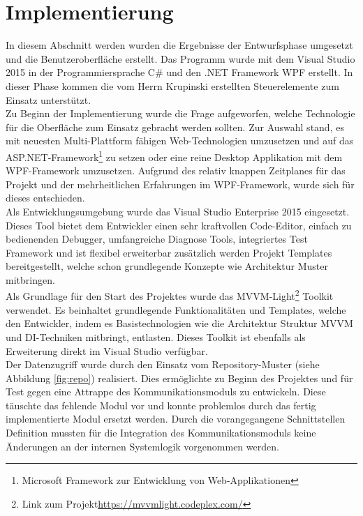 \section{Implementierung}
In diesem Abschnitt werden wurden die Ergebnisse der Entwurfsphase umgesetzt und die Benutzeroberfläche erstellt. Das Programm wurde mit dem Visual Studio 2015 in der Programmiersprache C\# und den .NET Framework WPF erstellt. In dieser Phase kommen die vom Herrn Krupinski erstellten Steuerelemente zum Einsatz unterstützt.\\

Zu Beginn der Implementierung wurde die Frage aufgeworfen, welche Technologie für die Oberfläche zum Einsatz gebracht werden sollten. Zur Auswahl stand, es mit neuesten Multi-Plattform fähigen Web-Technologien umzusetzen und auf das ASP.NET-Framework\footnote{Microsoft Framework zur Entwicklung von Web-Applikationen} zu setzen oder eine reine Desktop Applikation mit dem WPF-Framework umzusetzen. Aufgrund des relativ knappen Zeitplanes für das Projekt und der mehrheitlichen Erfahrungen im WPF-Framework, wurde sich für dieses entschieden.\\

Als Entwicklungsumgebung wurde das Visual Studio Enterprise 2015 eingesetzt. Dieses Tool bietet dem Entwickler einen sehr kraftvollen Code-Editor, einfach zu bedienenden Debugger, umfangreiche Diagnose Tools, integriertes Test Framework und ist flexibel erweiterbar zusätzlich werden Projekt Templates bereitgestellt, welche schon grundlegende Konzepte wie Architektur Muster mitbringen.\\

Als Grundlage für den Start des Projektes wurde das MVVM-Light\footnote{Link zum Projekt\url{https://mvvmlight.codeplex.com/}} Toolkit verwendet. Es beinhaltet grundlegende Funktionalitäten und Templates, welche den Entwickler, indem es Basistechnologien wie die Architektur Struktur MVVM und DI-Techniken mitbringt, entlasten. Dieses Toolkit ist ebenfalls als Erweiterung direkt im Visual Studio verfügbar.\\

Der Datenzugriff wurde durch den Einsatz vom Repository-Muster (siehe Abbildung \ref{fig:repo}) realisiert. Dies ermöglichte zu Beginn des Projektes und für Test gegen eine Attrappe des Kommunikationsmoduls zu entwickeln. Diese täuschte das fehlende Modul vor und konnte problemlos durch das fertig implementierte Modul ersetzt werden. Durch die vorangegangene Schnittstellen Definition mussten für die Integration des Kommunikationsmoduls keine Änderungen an der internen Systemlogik vorgenommen werden.   

